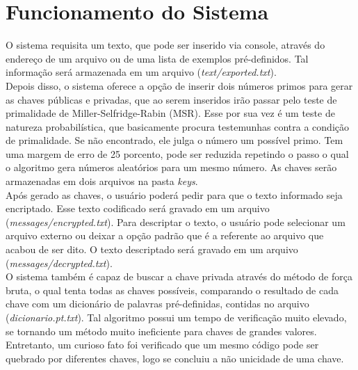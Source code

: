\chapter[Funcionamento do Sistema]{Funcionamento do Sistema}
\label{chap:sistema}
	O sistema requisita um texto, que pode ser inserido via console, através do endereço de um arquivo ou de uma lista de exemplos pré-definidos. Tal informação será armazenada em um arquivo (\emph{text/exported.txt}).
	\\ \indent Depois disso, o sistema oferece a opção de inserir dois números primos para gerar as chaves públicas e privadas, que ao serem inseridos irão passar pelo teste de primalidade de Miller-Selfridge-Rabin (MSR). Esse por sua vez é um teste de natureza probabilística, que basicamente procura testemunhas contra a condição de primalidade. Se não encontrado, ele julga o número um possível primo. Tem uma margem de erro de 25 porcento, pode ser reduzida repetindo o passo o qual o algoritmo gera números aleatórios para um mesmo número. As chaves serão armazenadas em dois arquivos na pasta \emph{keys}.
	\\ \indent Após gerado as chaves, o usuário poderá pedir para que o texto informado seja encriptado. Esse texto codificado será gravado em um arquivo (\emph{messages/encrypted.txt}). Para descriptar o texto, o usuário pode selecionar um arquivo externo ou deixar a opção padrão que é a referente ao arquivo que acabou de ser dito. O texto descriptado será gravado em um arquivo (\emph{messages/decrypted.txt}).
	\\ \indent O sistema também é capaz de buscar a chave privada através do método de força bruta, o qual tenta todas as chaves possíveis, comparando o resultado de cada chave com um dicionário de palavras pré-definidas, contidas no arquivo (\emph{dicionario.pt.txt}). Tal algoritmo possui um tempo de verificação muito elevado, se tornando um método muito ineficiente para chaves de grandes valores. Entretanto, um curioso fato foi verificado que um mesmo código pode ser quebrado por diferentes chaves, logo se concluiu a não unicidade de uma chave.